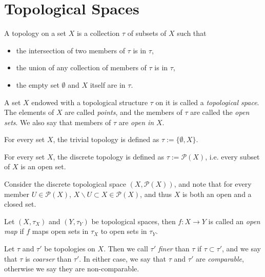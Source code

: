 \section{Topological Spaces}
\begin{defn}
	A topology on a set $X$ is a collection $\tau$ of subsets of $X$ such that 
	\begin{itemize}
		\item the intersection of two members of $\tau$ is in $\tau$, 
		\item the union of any collection of members of $\tau$ is in $\tau$, 
		\item the empty set $\emptyset$ and $X$ itself are in $\tau$.
	\end{itemize}
	A set $X$ endowed with a topological structure $\tau$ on it is called a \textit{topological space}. The elements of $X$ are called \textit{points}, and the members of $\tau$ are called the \textit{open sets}. We also say that members of $\tau$ are \textit{open in} $X$.
\end{defn} 

\begin{exmp}
	For every set $X$, the trivial topology is defined as $\tau := \{\emptyset, X\}$.
\end{exmp}

\begin{exmp}\label{exmp:discrete_topology}
	For every set $X$, the discrete topology is defined as $\tau := \mathcal P(X)$, i.e. every subset of $X$ is an open set.
\end{exmp}

\begin{remark}
	Consider the discrete topological space $(X, \mathscr P(X))$, and note that for every member $U\in \mathscr P(X)$, $X\backslash U\subset X\in \mathscr P(X)$, and thus $X$ is both an open and a closed set. 
\end{remark}

\begin{defn}\label{defn:open_map}
	Let $(X, \tau_X)$ and $(Y, \tau_Y)$ be topological spaces, then $f: X \to Y$ is called an \textit{open map} if $f$ maps open sets in $\tau_X$ to open sets in $\tau_Y$.
\end{defn}

\begin{defn}\label{defn:comparison_of_topologies}
	Let $\tau$ and $\tau'$ be topologies on $X$. Then we call $\tau'$ \textit{finer} than $\tau$ if $\tau\subset\tau'$, and we say that $\tau$ is \textit{coarser} than $\tau'$. In either case, we say that $\tau$ and $\tau'$ are \textit{comparable}, otherwise we say they are non-comparable.
\end{defn}

